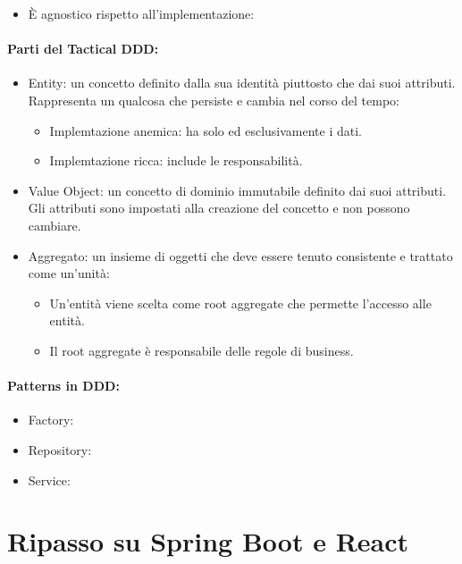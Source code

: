 \begin{itemize}
	\item È agnostico rispetto all'implementazione:
\end{itemize}

\paragraph{Parti del Tactical DDD:}

\begin{itemize}
	\item Entity: un concetto definito dalla sua identità piuttosto che dai suoi attributi. Rappresenta un qualcosa che persiste e cambia nel corso del tempo:
	      \begin{itemize}
		      \item Implemtazione anemica: ha solo ed esclusivamente i dati.
		      \item Implemtazione ricca: include le responsabilità.
	      \end{itemize}
	\item Value Object: un concetto di dominio immutabile definito dai suoi attributi. Gli attributi sono impostati alla creazione del concetto e non possono cambiare.
	\item Aggregato: un insieme di oggetti che deve essere tenuto consistente e trattato come un'unità:
	      \begin{itemize}
		      \item Un'entità viene scelta come root aggregate che permette l'accesso alle entità.
		      \item Il root aggregate è responsabile delle regole di business.
	      \end{itemize}
\end{itemize}

\paragraph{Patterns in DDD:}

\begin{itemize}
	\item Factory:
	\item Repository:
	\item Service:
\end{itemize}

\section{Ripasso su Spring Boot e React}

